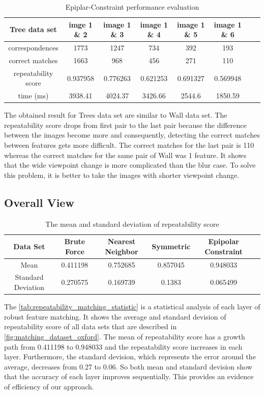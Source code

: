 \begin{table}[H]
  \begin{tabular}{| c || c | c | c | c | c | c | c |}
      \hline
      Tree data set & imge 1 \& 2 & image 1 \& 3 & image 1 \& 4 & image 1 \& 5 & image 1 \& 6 \\ \hline \hline
      correspondences & 1773 & 1247 & 734 & 392 & 193 \\ \hline
      correct matches & 1663 & 968 & 456 & 271 & 110 \\ \hline
      repeatability score & 0.937958 & 0.776263 & 0.621253 & 0.691327 & 0.569948 \\ \hline
      time (ms) & 3938.41 & 4024.37 & 3426.66 & 2544.6 & 1850.59 \\ \hline
  \end{tabular}
  \caption{Epiplar-Constraint performance evaluation} \label{tab:epipolar_matching_tree_eval}
\end{table}

The obtained result for Trees data set are similar to Wall data set. The repeatability score drops from first pair to the last pair because the difference between the images become more and consequently, detecting the correct matches between features gets more difficult. The correct matches for the last pair is 110 whereas the correct matches for the same pair of Wall was 1 feature. It shows that the wide viewpoint change is more complicated than the blur case. To solve this problem, it is better to take the images with shorter viewpoint change. 

\subsection {Overall View}
\begin{table}[H]
\centering
  \begin{tabular}{| c || c | c | c | c | c |}
      \hline
      Data Set & Brute Force & Nearest Neighbor & Symmetric & Epipolar Constraint \\ \hline \hline
      Mean & 0.411198 & 0.752685 & 0.857045 & 0.948033 \\  \hline
      Standard Deviation & 0.270575 & 0.169739 & 0.1383 & 0.065499 \\  \hline
  \end{tabular}
  \caption{The mean and standard deviation of repeatability score} \label{tab:repeatability_matching_statistic}
\end{table}

The \autoref{tab:repeatability_matching_statistic} is a statistical analysis of each layer of robust feature matching. It shows the average and standard devision of repeatability score of all data sets that are described in \autoref{fig:matching_dataset_oxford}. The mean of repeatability score has a growth path from 0.411198 to 0.948033 and the repeatability score increases in each layer. Furthermore, the standard devision, which represents the error around the average, decreases from 0.27 to 0.06. So both mean and standard devision show that the accuracy of each layer improves sequentially. This provides an evidence of efficiency of our approach.